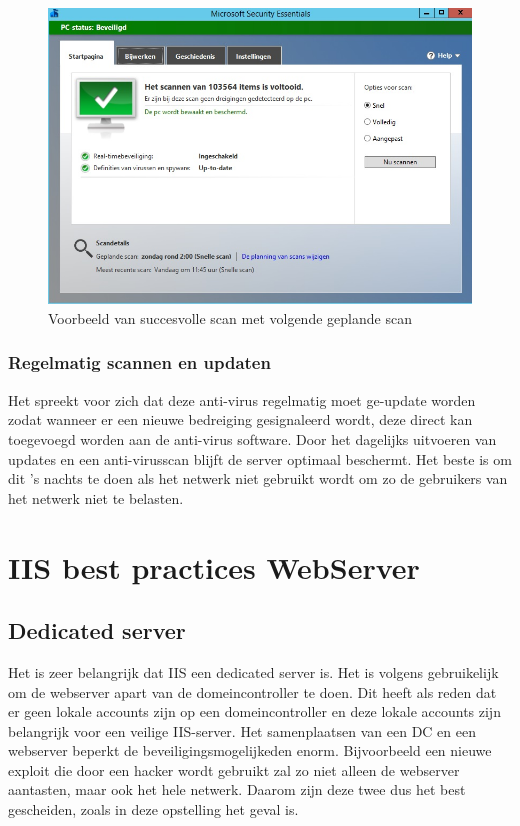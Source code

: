 \documentclass[pdftex,a4paper,12pt]{report}
\begin{document}
\begin{figure}[H]
\begin{center}
\includegraphics[scale=0.60]{img/AntiVirus}
\end{center}
\caption{Voorbeeld van succesvolle scan met volgende geplande scan}
\label{img:AntiVirus}
\end{figure}

\subsubsection{Regelmatig scannen en updaten}
Het spreekt voor zich dat deze anti-virus regelmatig moet ge-update worden zodat wanneer er een nieuwe bedreiging gesignaleerd wordt, deze direct kan toegevoegd worden aan de anti-virus software. Door het dagelijks uitvoeren van updates en een anti-virusscan blijft de server optimaal beschermt. Het beste is om dit 's nachts te doen als het netwerk niet gebruikt wordt om zo de gebruikers van het netwerk niet te belasten. 

\section{IIS best practices WebServer}
\subsection{Dedicated server}
Het is zeer belangrijk dat IIS een dedicated server is. Het is volgens \cite{Microsoft2013} gebruikelijk om de webserver apart van de domeincontroller te doen. Dit heeft als reden dat er geen lokale accounts zijn op een domeincontroller en deze lokale accounts zijn belangrijk voor een veilige IIS-server. Het samenplaatsen van een DC en een webserver beperkt de beveiligingsmogelijkeden enorm. Bijvoorbeeld een nieuwe exploit die door een hacker wordt gebruikt zal zo niet alleen de webserver aantasten, maar ook het hele netwerk. Daarom zijn deze twee dus het best gescheiden, zoals in deze opstelling het geval is.
\end{document}
